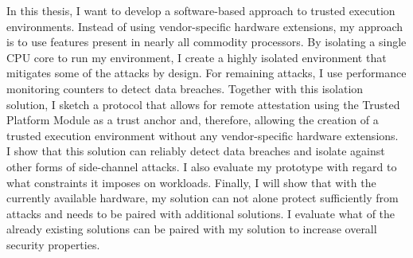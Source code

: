 In this thesis, I want to develop a software-based approach to trusted execution
environments. Instead of using vendor-specific hardware extensions, my approach
is to use features present in nearly all commodity processors. By isolating a
single CPU core to run my environment, I create a highly isolated environment
that mitigates some of the attacks by design. For remaining attacks, I use
performance monitoring counters to detect data breaches. Together with this
isolation solution, I sketch a protocol that allows for remote attestation using
the Trusted Platform Module as a trust anchor and, therefore, allowing the
creation of a trusted execution environment without any vendor-specific hardware
extensions.\\

I show that this solution can reliably detect data breaches and isolate against
other forms of side-channel attacks. I also evaluate my prototype with regard to
what constraints it imposes on workloads. Finally, I will show that with the
currently available hardware, my solution can not alone protect sufficiently
from attacks and needs to be paired with additional solutions. I evaluate what
of the already existing solutions can be paired with my solution to increase
overall security properties.



